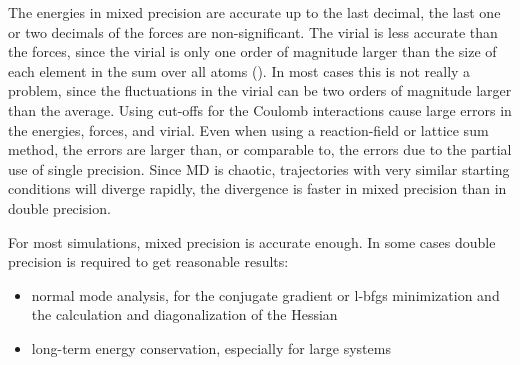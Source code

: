 The energies in mixed precision are accurate up to the last decimal,
the last one or two decimals of the forces are non-significant.
The virial is less accurate than the forces, since the virial is only one
order of magnitude larger than the size of each element in the sum over
all atoms ().
In most cases this is not really a problem, since the fluctuations in the
virial can be two orders of magnitude larger than the average.
Using cut-offs for the Coulomb interactions cause large errors
in the energies, forces, and virial.
Even when using a reaction-field or lattice sum method, the errors
are larger than, or comparable to, the errors due to the partial use of
single precision.
Since MD is chaotic, trajectories with very similar starting conditions will
diverge rapidly, the divergence is faster in mixed precision than in double
precision.

For most simulations, mixed precision is accurate enough.
In some cases double precision is required to get reasonable results:
\begin{itemize}
\item normal mode analysis,
for the conjugate gradient or l-bfgs minimization and the calculation and
diagonalization of the Hessian
\item long-term energy conservation, especially for large systems
\end{itemize}


